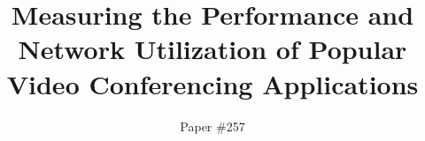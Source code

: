 \documentclass[fontsize=10pt,conference=acm, submission]{confpaper}
\title{Measuring the Performance and Network Utilization of Popular Video Conferencing Applications}
\author{ Paper \#257}
\begin{document}
\begin{sloppypar}


\maketitle








\balance



\newpage
\balance\printbibliography


\end{sloppypar}
\end{document}
